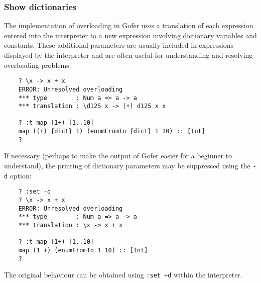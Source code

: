 \subsubsection{Show dictionaries}
The implementation of overloading in Gofer uses a translation of each
expression entered into the interpreter to a new expression involving
dictionary variables and constants.  These additional parameters are
usually included in expressions displayed by the interpreter and are
often useful for understanding and resolving overloading problems:
\begin{verbatim}
    ? \x -> x + x
    ERROR: Unresolved overloading
    *** type        : Num a => a -> a
    *** translation : \d125 x -> (+) d125 x x

    ? :t map (1+) [1..10]
    map ((+) {dict} 1) (enumFromTo {dict} 1 10) :: [Int]
    ?
\end{verbatim}
If necessary (perhaps to make the output of Gofer easier for a beginner
to understand), the printing of dictionary parameters may be suppressed
using the \verb"-d" option:
\begin{verbatim}
    ? :set -d
    ? \x -> x + x
    ERROR: Unresolved overloading
    *** type        : Num a => a -> a
    *** translation : \x -> x + x

    ? :t map (1+) [1..10]
    map (1 +) (enumFromTo 1 10) :: [Int]
    ?
\end{verbatim}
The original behaviour can be obtained using \verb":set +d" within the
interpreter.


